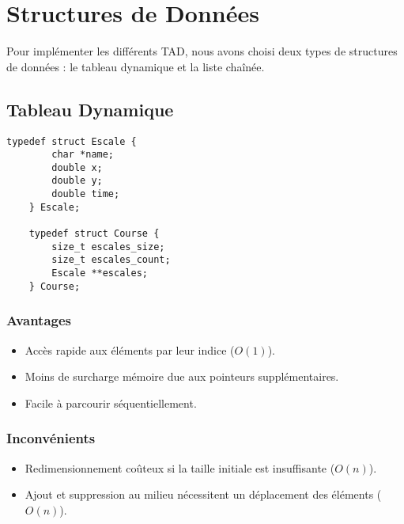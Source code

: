 \section{Structures de Données}\label{structures}

Pour implémenter les différents TAD, nous avons choisi deux types de structures de données : le tableau dynamique et la liste chaînée.

\subsection{Tableau Dynamique}

\begin{lstlisting}[caption={Structure de données (tableau)}]
    typedef struct Escale {
        char *name;
        double x;
        double y;
        double time;
    } Escale;

    typedef struct Course {
        size_t escales_size;
        size_t escales_count;
        Escale **escales;
    } Course;
\end{lstlisting}

\subsubsection{Avantages}
\begin{itemize}
    \item Accès rapide aux éléments par leur indice ($O(1)$).
    \item Moins de surcharge mémoire due aux pointeurs supplémentaires.
    \item Facile à parcourir séquentiellement.
\end{itemize}

\subsubsection{Inconvénients}
\begin{itemize}
    \item Redimensionnement coûteux si la taille initiale est insuffisante ($O(n)$).
    \item Ajout et suppression au milieu nécessitent un déplacement des éléments ($O(n)$).
\end{itemize}

